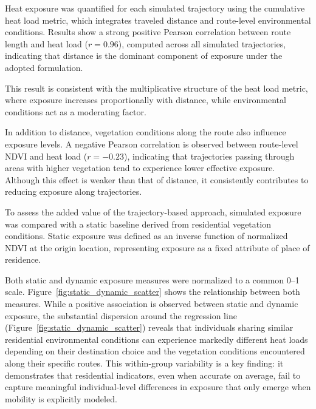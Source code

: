 \documentclass{wscpaperproc}
\theoremstyle{wsc}
\begin{document}
Heat exposure was quantified for each simulated trajectory using the cumulative heat load metric, which integrates traveled distance and route-level environmental conditions. %
Results show a strong positive Pearson correlation between route length and heat load ($r = 0.96$), computed across all simulated trajectories, indicating that distance is the dominant component of exposure under the adopted formulation.

This result is consistent with the multiplicative structure of the heat load metric, where exposure increases proportionally with distance, while environmental conditions act as a moderating factor.

In addition to distance, vegetation conditions along the route also influence exposure levels. %
A negative Pearson correlation is observed between route-level NDVI and heat load ($r = -0.23$), indicating that trajectories passing through areas with higher vegetation tend to experience lower effective exposure. Although this effect is weaker than that of distance, it consistently contributes to reducing exposure along trajectories.

To assess the added value of the trajectory-based approach, simulated exposure was compared with a static baseline derived from residential vegetation conditions. Static exposure was defined as an inverse function of normalized NDVI at the origin location, representing exposure as a fixed attribute of place of residence.

Both static and dynamic exposure measures were normalized to a common 0--1 scale. Figure~\ref{fig:static_dynamic_scatter} shows the relationship between both measures. 
While a positive association is observed between static and dynamic exposure, the substantial dispersion around the regression line (Figure~\ref{fig:static_dynamic_scatter}) reveals that individuals sharing similar residential environmental conditions can experience markedly different heat loads depending on their destination choice and the vegetation conditions encountered along their specific routes. This within-group variability is a key finding: it demonstrates that residential indicators, even when accurate on average, fail to capture meaningful individual-level differences in exposure that only emerge when mobility is explicitly modeled.

\end{document}
